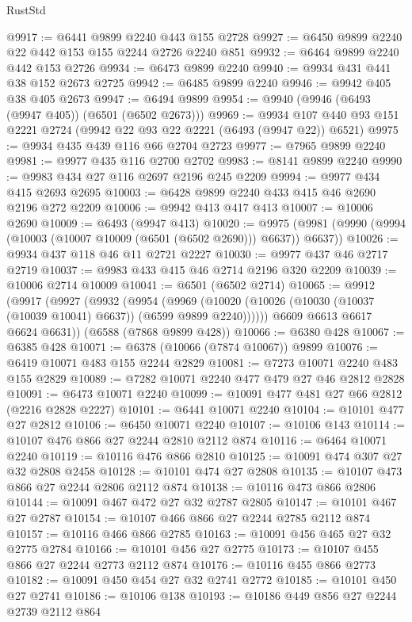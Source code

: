 \begin{lexlean}{RustStd}
\begin{coremodule}
@9917 := @6441 @9899 @2240 @443 @155 @2728
@9927 := @6450 @9899 @2240 @22 @442 @153 @155 @2244 @2726 @2240 @851
@9932 := @6464 @9899 @2240 @442 @153 @2726
@9934 := @6473 @9899 @2240
@9940 := @9934 @431 @441 @38 @152 @2673 @2725
@9942 := @6485 @9899 @2240
@9946 := @9942 @405 @38 @405 @2673
@9947 := @6494 @9899
@9954 := @9940 (@9946 (@6493 (@9947 @405)) (@6501 (@6502 @2673)))
@9969 := @9934 @107 @440 @93 @151 @2221 @2724 (@9942 @22 @93 @22 @2221 (@6493 (@9947 @22)) @6521)
@9975 := @9934 @435 @439 @116 @66 @2704 @2723
@9977 := @7965 @9899 @2240
@9981 := @9977 @435 @116 @2700 @2702
@9983 := @8141 @9899 @2240
@9990 := @9983 @434 @27 @116 @2697 @2196 @245 @2209
@9994 := @9977 @434 @415 @2693 @2695
@10003 := @6428 @9899 @2240 @433 @415 @46 @2690 @2196 @272 @2209
@10006 := @9942 @413 @417 @413
@10007 := @10006 @2690
@10009 := @6493 (@9947 @413)
@10020 := @9975 (@9981 (@9990 (@9994 (@10003 (@10007 @10009 (@6501 (@6502 @2690))) @6637)) @6637))
@10026 := @9934 @437 @118 @46 @11 @2721 @2227
@10030 := @9977 @437 @46 @2717 @2719
@10037 := @9983 @433 @415 @46 @2714 @2196 @320 @2209
@10039 := @10006 @2714 @10009
@10041 := @6501 (@6502 @2714)
@10065 := @9912
    (@9917
      (@9927
        (@9932
          (@9954
            (@9969 (@10020 (@10026 (@10030 (@10037 (@10039 @10041) @6637)) (@6599 @9899 @2240))))))
        @6609
        @6613
        @6617
        @6624
        @6631))
    (@6588 (@7868 @9899 @428))
@10066 := @6380 @428
@10067 := @6385 @428
@10071 := @6378 (@10066 (@7874 @10067)) @9899
@10076 := @6419 @10071 @483 @155 @2244 @2829
@10081 := @7273 @10071 @2240 @483 @155 @2829
@10089 := @7282 @10071 @2240 @477 @479 @27 @46 @2812 @2828
@10091 := @6473 @10071 @2240
@10099 := @10091 @477 @481 @27 @66 @2812 (@2216 @2828 @2227)
@10101 := @6441 @10071 @2240
@10104 := @10101 @477 @27 @2812
@10106 := @6450 @10071 @2240
@10107 := @10106 @143
@10114 := @10107 @476 @866 @27 @2244 @2810 @2112 @874
@10116 := @6464 @10071 @2240
@10119 := @10116 @476 @866 @2810
@10125 := @10091 @474 @307 @27 @32 @2808 @2458
@10128 := @10101 @474 @27 @2808
@10135 := @10107 @473 @866 @27 @2244 @2806 @2112 @874
@10138 := @10116 @473 @866 @2806
@10144 := @10091 @467 @472 @27 @32 @2787 @2805
@10147 := @10101 @467 @27 @2787
@10154 := @10107 @466 @866 @27 @2244 @2785 @2112 @874
@10157 := @10116 @466 @866 @2785
@10163 := @10091 @456 @465 @27 @32 @2775 @2784
@10166 := @10101 @456 @27 @2775
@10173 := @10107 @455 @866 @27 @2244 @2773 @2112 @874
@10176 := @10116 @455 @866 @2773
@10182 := @10091 @450 @454 @27 @32 @2741 @2772
@10185 := @10101 @450 @27 @2741
@10186 := @10106 @138
@10193 := @10186 @449 @856 @27 @2244 @2739 @2112 @864

\end{coremodule}
\end{lexlean}
